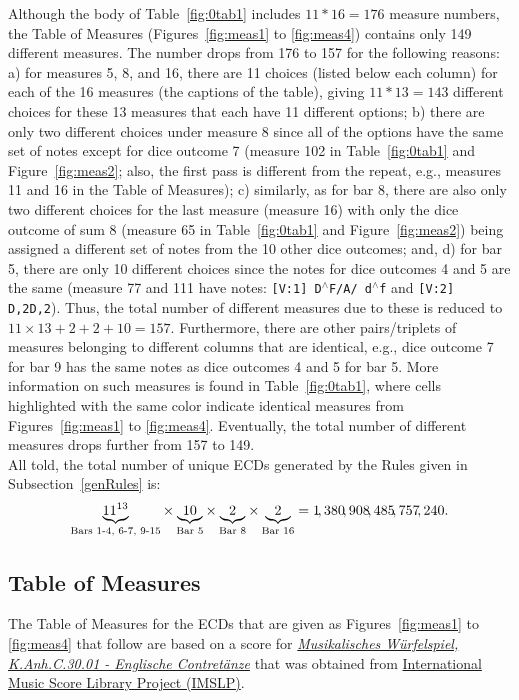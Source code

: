 \documentclass[letterpaper,x11names,svgnames,10pt]{article}
\begin{document}
Although the body of Table~\ref{fig:0tab1} includes $11*16 = 176$ measure numbers, the Table of Measures (Figures~\ref{fig:meas1} to \ref{fig:meas4}) contains only 149 different measures.  The number drops from 176 to 157 for the following reasons: a) for measures 5, 8, and 16, there are 11 choices (listed below each column) for each of the 16 measures (the captions of the table), giving $11*13=143$ different choices for these 13 measures that each have 11 different options; b) there are only two different choices under measure 8 since all of the options have the same set of notes except for dice outcome 7 (measure 102 in Table~\ref{fig:0tab1} and Figure~\ref{fig:meas2};  also, the first pass is different from the repeat, e.g., measures 11 and 16 in the Table of Measures); c) similarly, as for bar 8, there are also only two different choices for the last measure (measure 16) with only the dice outcome of sum 8 (measure 65 in Table~\ref{fig:0tab1} and Figure~\ref{fig:meas2}) being assigned a different set of notes from the 10 other dice outcomes; and, d) for bar 5, there are only 10 different choices since the notes for dice outcomes 4 and 5 are the same (measure 77 and 111 have notes: {\tt [V:1] D$^\wedge$F/A/ d$^\wedge$f} and {\tt [V:2] D,2D,2}).  Thus, the total number of different measures due to these is reduced to $11\times 13 + 2 + 2 + 10 = 157$. Furthermore, there are other pairs/triplets of measures belonging to different columns that are identical, e.g., dice outcome 7 for bar 9 has the same notes as dice outcomes 4 and 5 for bar 5.  More information on such measures is found in Table~\ref{fig:0tab1}, where cells highlighted with the same color indicate identical measures from Figures~\ref{fig:meas1} to \ref{fig:meas4}. Eventually, the total number of different measures drops further from 157 to 149. \\

All told, the total number of unique ECDs generated by the Rules given in Subsection~\ref{genRules} is: $$ \underbrace{11^{13}}_{\tiny\text{Bars 1-4, 6-7, 9-15}} \times \underbrace{10}_{\tiny\text{Bar 5}} \times \underbrace{2}_{\tiny\text{Bar 8}} \times \underbrace{2}_{\tiny\text{Bar 16}} = 1\!,380\!,908\!,485\!,757\!,240.$$
 
\subsection{Table of Measures}

The Table of Measures for the ECDs that are given as Figures~\ref{fig:meas1} to \ref{fig:meas4} that follow are based on a score for \href{https://imslp.org/wiki/Musikalische_W\%C3\%BCrfelspiele\%2C_K.Anh.C.30.01_(Mozart\%2C_Wolfgang_Amadeus)}{\em Musikalisches W\"{u}rfelspiel, K.Anh.C.30.01 - Englische Contret\"{a}nze} that was obtained from \href{http://imslp.org/}{International Music Score Library Project (IMSLP)}.  
\end{document}
